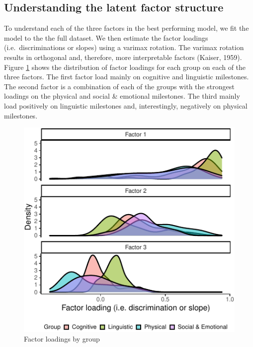 \documentclass[10pt, letterpaper]{article}
\newenvironment{CodeChunk}{}{}
\begin{document}
\hypertarget{understanding-the-latent-factor-structure}{%
\subsection{Understanding the latent factor
structure}\label{understanding-the-latent-factor-structure}}

To understand each of the three factors in the best performing model, we
fit the model to the the full dataset. We then estimate the factor
loadings (i.e.~discriminations or slopes) using a varimax rotation. The
varimax rotation results in orthogonal and, therefore, more
interpretable factors (Kaiser, 1959). Figure \ref{fig:factorloadings}
shows the distribution of factor loadings for each group on each of the
three factors. The first factor load mainly on cognitive and linguistic
milestones. The second factor is a combination of each of the groups
with the strongest loadings on the physical and social \& emotional
milestones. The third mainly load positively on linguistic milestones
and, interestingly, negatively on physical milestones.

\begin{CodeChunk}
\begin{figure}[tb]
\includegraphics{figs/factorloadings-1} \caption[Factor loadings by group]{Factor loadings by group}\label{fig:factorloadings}
\end{figure}
\end{CodeChunk}
\end{document}
